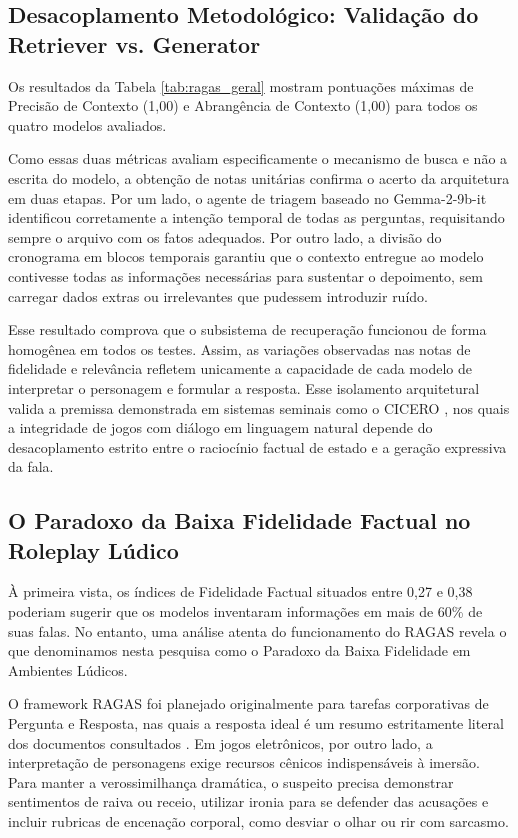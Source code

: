 

\subsection{Desacoplamento Metodológico: Validação do Retriever vs. Generator}
\label{subsec:desacoplamento}

Os resultados da Tabela \ref{tab:ragas_geral} mostram pontuações máximas de Precisão de Contexto (1,00) e Abrangência de Contexto (1,00) para todos os quatro modelos avaliados.

Como essas duas métricas avaliam especificamente o mecanismo de busca e não a escrita do modelo, a obtenção de notas unitárias confirma o acerto da arquitetura em duas etapas. Por um lado, o agente de triagem baseado no Gemma-2-9b-it identificou corretamente a intenção temporal de todas as perguntas, requisitando sempre o arquivo com os fatos adequados. Por outro lado, a divisão do cronograma em blocos temporais garantiu que o contexto entregue ao modelo contivesse todas as informações necessárias para sustentar o depoimento, sem carregar dados extras ou irrelevantes que pudessem introduzir ruído.

Esse resultado comprova que o subsistema de recuperação funcionou de forma homogênea em todos os testes. Assim, as variações observadas nas notas de fidelidade e relevância refletem unicamente a capacidade de cada modelo de interpretar o personagem e formular a resposta. Esse isolamento arquitetural valida a premissa demonstrada em sistemas seminais como o CICERO \cite{bakhtin2022diplomacy}, nos quais a integridade de jogos com diálogo em linguagem natural depende do desacoplamento estrito entre o raciocínio factual de estado e a geração expressiva da fala.

\subsection{O Paradoxo da Baixa Fidelidade Factual no Roleplay Lúdico}
\label{subsec:paradoxo_fidelidade}

À primeira vista, os índices de Fidelidade Factual situados entre 0,27 e 0,38 poderiam sugerir que os modelos inventaram informações em mais de 60\% de suas falas. No entanto, uma análise atenta do funcionamento do RAGAS revela o que denominamos nesta pesquisa como o Paradoxo da Baixa Fidelidade em Ambientes Lúdicos.

O framework RAGAS foi planejado originalmente para tarefas corporativas de Pergunta e Resposta, nas quais a resposta ideal é um resumo estritamente literal dos documentos consultados \cite{es2024ragas}. Em jogos eletrônicos, por outro lado, a interpretação de personagens exige recursos cênicos indispensáveis à imersão. Para manter a verossimilhança dramática, o suspeito precisa demonstrar sentimentos de raiva ou receio, utilizar ironia para se defender das acusações e incluir rubricas de encenação corporal, como desviar o olhar ou rir com sarcasmo.


